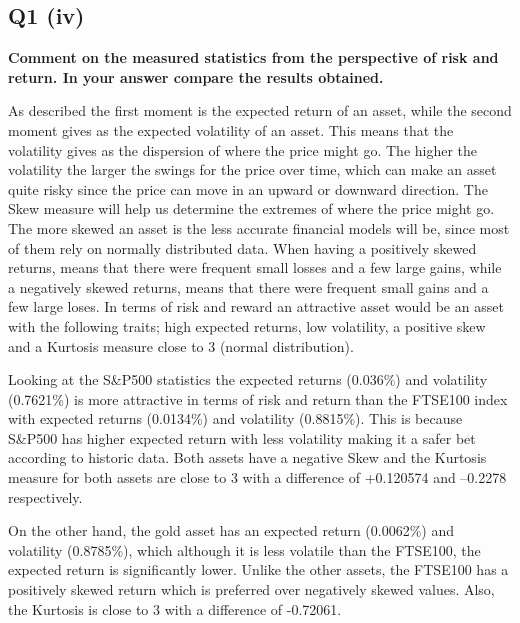 

\subsection{Q1 (iv)}\label{sssec:pt1q1iv}

\textbf{Comment on the measured statistics from the perspective of risk and return. In your answer
compare the results obtained.}

\noindent
As described the first moment is the expected return of an asset, while the second moment gives as the expected volatility of an asset. This means that the volatility gives as the dispersion of where the price might go. The higher the volatility the larger the swings for the price over time, which can make an asset quite risky since the price can move in an upward or downward direction. The Skew measure will help us determine the extremes of where the price might go. The more skewed an asset is the less accurate financial models will be, since most of them rely on normally distributed data. When having a positively skewed returns, means that there were frequent small losses and a few large gains, while a negatively skewed returns, means that there were frequent small gains and a few large loses. In terms of risk and reward an attractive asset would be an asset with the following traits; high expected returns, low volatility, a positive skew and a Kurtosis measure close to 3 (normal distribution). 

\noindent
Looking at the S\&P500 statistics the expected returns (0.036\%) and volatility (0.7621\%) is more attractive in terms of risk and return than the FTSE100 index with expected returns (0.0134\%) and volatility (0.8815\%). This is because S\&P500 has higher expected return with less volatility making it a safer bet according to historic data. Both assets have a negative Skew and the Kurtosis measure for both assets are close to 3 with a difference of +0.120574 and –0.2278 respectively.

\noindent
On the other hand, the gold asset has an expected return (0.0062\%) and volatility (0.8785\%), which although it is less volatile than the FTSE100, the expected return is significantly lower. Unlike the other assets, the FTSE100 has a positively skewed return which is preferred over negatively skewed values. Also, the Kurtosis is close to 3 with a difference of -0.72061. 

